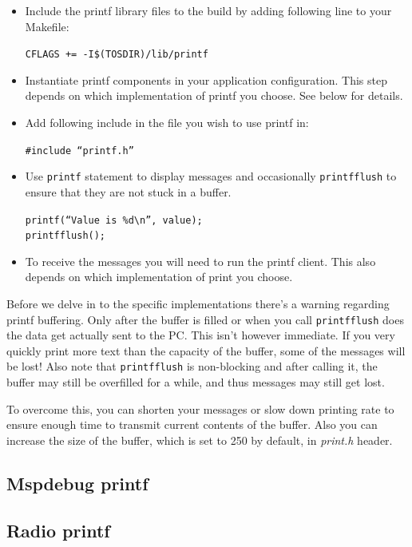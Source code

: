 \begin{itemize}
  \item Include the printf library files to the build by adding
    following line to your Makefile:

    \texttt{CFLAGS += -I\$(TOSDIR)/lib/printf}

  \item Instantiate printf components in your application
    configuration. This step depends on which implementation of
    printf you choose. See below for details.

  \item Add following include in the file you wish to use printf in:

    \texttt{\#include ``printf.h''}

  \item Use \texttt{printf} statement to display messages and
    occasionally \texttt{printfflush} to ensure that they are not stuck
    in a buffer.

    \texttt{printf(``Value is \%d\textbackslash n'', value);} \\
    \texttt{printfflush();}

  \item To receive the messages you will need to run the printf
    client. This also depends on which implementation of print you
    choose.
\end{itemize}

Before we delve in to the specific implementations there's a warning
regarding printf buffering. Only after the buffer is filled or when
you call \texttt{printfflush} does the data get actually sent to the
PC. This isn't however immediate. If you very quickly print more text
than the capacity of the buffer, some of the messages will be lost!
Also note that \texttt{printfflush} is non-blocking and after calling
it, the buffer may still be overfilled for a while, and thus messages
may still get lost.

To overcome this,  you can shorten your messages or slow down printing
rate to ensure enough time to transmit current contents of the buffer.
Also you can increase the size of the buffer, which is set to 250 by
default, in \emph{print.h} header.

\subsection{Mspdebug printf}

\subsection{Radio printf}

